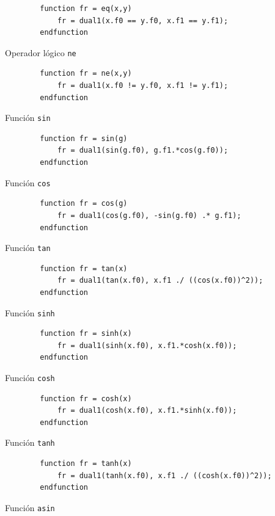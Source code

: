 \documentclass[a4paper, 12pt]{article}
\begin{document}
    \begin{verbatim}
        function fr = eq(x,y)
            fr = dual1(x.f0 == y.f0, x.f1 == y.f1);
        endfunction
    \end{verbatim}

    Operador lógico \verb|ne|

    \begin{verbatim}
        function fr = ne(x,y)
            fr = dual1(x.f0 != y.f0, x.f1 != y.f1);
        endfunction
    \end{verbatim}

    Función \verb|sin|

    \begin{verbatim}
        function fr = sin(g)
            fr = dual1(sin(g.f0), g.f1.*cos(g.f0));
        endfunction
    \end{verbatim}

    Función \verb|cos|

    \begin{verbatim}
        function fr = cos(g)
            fr = dual1(cos(g.f0), -sin(g.f0) .* g.f1);
        endfunction
    \end{verbatim}

    Función \verb|tan|

    \begin{verbatim}
        function fr = tan(x)
            fr = dual1(tan(x.f0), x.f1 ./ ((cos(x.f0))^2));
        endfunction
    \end{verbatim}

    Función \verb|sinh|

    \begin{verbatim}
        function fr = sinh(x)
            fr = dual1(sinh(x.f0), x.f1.*cosh(x.f0));
        endfunction
    \end{verbatim}

    Función \verb|cosh|

    \begin{verbatim}
        function fr = cosh(x)
            fr = dual1(cosh(x.f0), x.f1.*sinh(x.f0));
        endfunction
    \end{verbatim}

    Función \verb|tanh|

    \begin{verbatim}
        function fr = tanh(x)
            fr = dual1(tanh(x.f0), x.f1 ./ ((cosh(x.f0))^2));
        endfunction
    \end{verbatim}

    Función \verb|asin|
\end{document}
